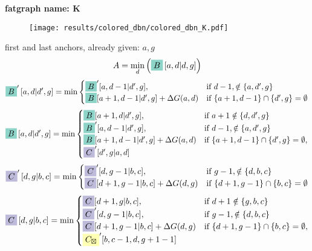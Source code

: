 \documentclass{article}
\begin{document}
\textbf{fatgraph name: K}
\begin{center}
\begin{figure}[h]
\texttt{[image: results/colored\_dbn/colored\_dbn\_K.pdf]}
\end{figure}
\end{center}
first and last anchors, already given: $ a , g $
$$ A =\min_{ d } \left( \colorbox{c0}{$B$}\left[a,d|d,g\right]\right) $$
$$ \colorbox{c0}{$B$}' \left[a,d | d',g \right] =  \min\begin{cases}\colorbox{c0}{$B$}'[ a , d-1|d',g ], &\text{if } d-1 ,\notin\{ a , d',g \} \\\colorbox{c0}{$B$}[ a+1 , d-1|d',g ]+\Delta G(a,d) &\text{if } \{ a+1 , d-1 \}\cap \{ d',g \}=\emptyset\end{cases}$$
$$ \colorbox{c0}{$B$} \left[a,d | d',g \right] =  \min\begin{cases}\colorbox{c0}{$B$}[ a+1 , d|d',g ], &\text{if } a+1 \notin\{ d , d',g \} \\\colorbox{c0}{$B$}'[ a , d-1|d',g ], &\text{if } d-1 ,\notin\{ a , d',g \} \\\colorbox{c0}{$B$}[ a+1 , d-1|d',g ]+\Delta G(a,d) &\text{if } \{ a+1 , d-1 \}\cap \{ d',g \}=\emptyset,\\\colorbox{c2}{$C$}'[d',g|a,d]\end{cases}$$
$$ \colorbox{c2}{$C$}' \left[d,g | b,c \right] =  \min\begin{cases}\colorbox{c2}{$C$}'[ d , g-1|b,c ], &\text{if } g-1 ,\notin\{ d , b,c \} \\\colorbox{c2}{$C$}[ d+1 , g-1|b,c ]+\Delta G(d,g) &\text{if } \{ d+1 , g-1 \}\cap \{ b,c \}=\emptyset\end{cases}$$
$$ \colorbox{c2}{$C$} \left[d,g | b,c \right] =  \min\begin{cases}\colorbox{c2}{$C$}[ d+1 , g|b,c ], &\text{if } d+1 \notin\{ g , b,c \} \\\colorbox{c2}{$C$}'[ d , g-1|b,c ], &\text{if } g-1 ,\notin\{ d , b,c \} \\\colorbox{c2}{$C$}[ d+1 , g-1|b,c ]+\Delta G(d,g) &\text{if } \{ d+1 , g-1 \}\cap \{ b,c \}=\emptyset,\\\colorbox{c1}{$C_{\boxtimes}$}'[b,c-1,d,g+1-1]\end{cases}$$
\end{document}
